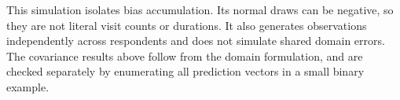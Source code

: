\documentclass[11pt,letterpaper]{article}
\begin{document}
This simulation isolates bias accumulation. Its normal draws can be negative,
so they are not literal visit counts or durations. It also generates observations
independently across respondents and does not simulate shared domain errors.
The covariance results above follow from the domain formulation, and are checked
separately by enumerating all prediction vectors in a small binary example.

\clearpage
\begingroup
\small
\setlength{\bibsep}{3pt}
\raggedright


\endgroup
\end{document}
